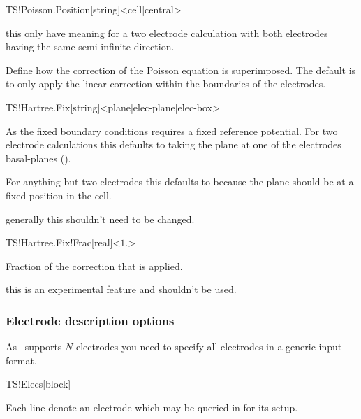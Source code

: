 \begin{fdfentry}{TS!Poisson.Position}[string]<cell|central>

  \note this only have meaning for a two electrode calculation with
  both electrodes having the same semi-infinite direction.

  Define how the correction of the Poisson equation is
  superimposed. The default is to only apply the linear correction
  within the boundaries of the electrodes. 

\end{fdfentry}

\begin{fdfentry}{TS!Hartree.Fix}[string]<plane|elec-plane|elec-box>

  As the fixed boundary conditions requires a fixed reference
  potential. For two electrode calculations this defaults to taking
  the plane at one of the electrodes basal-planes (). 

  For anything but two electrodes this defaults to 
  because the plane should be at a fixed position in the cell. 

  \note generally this shouldn't need to be changed.

\end{fdfentry}

\begin{fdfentry}{TS!Hartree.Fix!Frac}[real]<$1.$>

  Fraction of the correction that is applied.

  \note this is an experimental feature and shouldn't be used.

\end{fdfentry}


\subsubsection{Electrode description options}

As \tsiesta\ supports $N$ electrodes you need to specify all
electrodes in a generic input format.

\begin{fdfentry}{TS!Elecs}[block]

  Each line denote an electrode which may be queried in
   for its setup.
  
\end{fdfentry}

